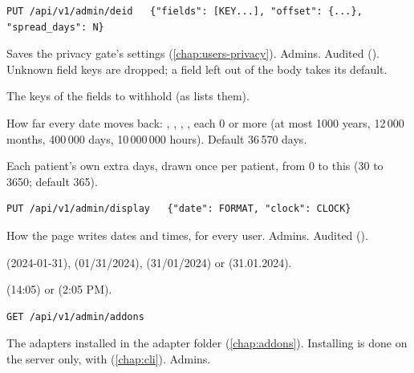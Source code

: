 \begin{lstlisting}[style=signature]
PUT /api/v1/admin/deid   {"fields": [KEY...], "offset": {...}, "spread_days": N}
\end{lstlisting}
Saves the privacy gate's settings (\cref{chap:users-privacy}). Admins. Audited
(). Unknown field keys are dropped; a field left out of the body takes
its default.
\begin{params}
\item[fields] The keys of the fields to withhold (as  lists them).
\item[offset] How far every date moves back: , , ,
  , each 0 or more (at most 1000 years, 12\,000 months, 400\,000 days,
  10\,000\,000 hours). Default 36\,570 days.
\item[spread\_days] Each patient's own extra days, drawn once per patient, from 0 to this
  (30 to 3650; default 365).
\end{params}

\begin{lstlisting}[style=signature]
PUT /api/v1/admin/display   {"date": FORMAT, "clock": CLOCK}
\end{lstlisting}
How the page writes dates and times, for every user. Admins. Audited ().
\begin{params}
\item[date]  (2024-01-31),  (01/31/2024),  (31/01/2024) or
   (31.01.2024).
\item[clock]  (14:05) or  (2:05 PM).
\end{params}

\begin{lstlisting}[style=signature]
GET /api/v1/admin/addons
\end{lstlisting}
The adapters installed in the adapter folder (\cref{chap:addons}). Installing is done on the
server only, with  (\cref{chap:cli}). Admins.

